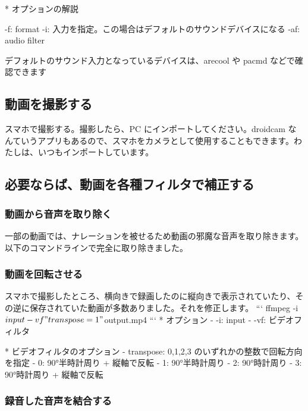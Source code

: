 \documentclass[mingoth,a4paper]{jsarticle}
\begin{document}
* オプションの解説
\begin{commandline}
  -f: format
  -i: 入力を指定。この場合はデフォルトのサウンドデバイスになる
  -af: audio filter
\end{commandline}

デフォルトのサウンド入力となっているデバイスは、arecool や pacmd などで確認できます

\subsection{動画を撮影する}
スマホで撮影する。撮影したら、PC にインポートしてください。droidcam なんていうアプリもあるので、スマホをカメラとして使用することもできます。わたしは、いつもインポートしています。

\subsection{必要ならば、動画を各種フィルタで補正する}

\subsubsection{動画から音声を取り除く}
一部の動画では、ナレーションを被せるため動画の邪魔な音声を取り除きます。以下のコマンドラインで完全に取り除きました。
%
%
\subsubsection{ 動画を回転させる}
スマホで撮影したところ、横向きで録画したのに縦向きで表示されていたり、その逆に保存されていた動画が多数ありました。それを修正します。
```
ffmpeg -i ${input} -vf "transpose=1" ${output}.mp4
```
* オプション
  - -i: input
  - -vf: ビデオフィルタ

* ビデオフィルタのオプション
  - transpose: 0,1,2,3 のいずれかの整数で回転方向を指定
	  - 0: 90°半時計周り + 縦軸で反転
	  - 1: 90°半時計周り
	  - 2: 90°時計周り
	  - 3: 90°時計周り + 縦軸で反転

\subsubsection{録音した音声を結合する}
%
%
%
%
%
\end{document}
